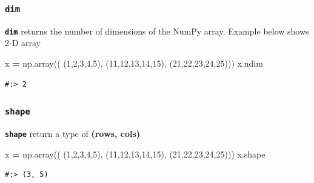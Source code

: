 \documentclass[
]{book}
\newenvironment{Shaded}{\begin{snugshade}}{\end{snugshade}}
\newcommand{\DecValTok}[1]{\textcolor[rgb]{0.06,0.06,0.06}{#1}}
\newcommand{\NormalTok}[1]{#1}
\newcommand{\OperatorTok}[1]{\textcolor[rgb]{0.43,0.43,0.43}{\textbf{#1}}}
\begin{document}
\hypertarget{dim}{%
\subsubsection{\texorpdfstring{\texttt{dim}}{dim}}\label{dim}}

\textbf{\texttt{dim}} returns the number of dimensions of the NumPy array. Example below shows 2-D array

\begin{Shaded}
\begin{Highlighting}[]
\NormalTok{x }\OperatorTok{=}\NormalTok{ np.array(( (}\DecValTok{1}\NormalTok{,}\DecValTok{2}\NormalTok{,}\DecValTok{3}\NormalTok{,}\DecValTok{4}\NormalTok{,}\DecValTok{5}\NormalTok{), }
\NormalTok{      (}\DecValTok{11}\NormalTok{,}\DecValTok{12}\NormalTok{,}\DecValTok{13}\NormalTok{,}\DecValTok{14}\NormalTok{,}\DecValTok{15}\NormalTok{),}
\NormalTok{      (}\DecValTok{21}\NormalTok{,}\DecValTok{22}\NormalTok{,}\DecValTok{23}\NormalTok{,}\DecValTok{24}\NormalTok{,}\DecValTok{25}\NormalTok{)))}
\NormalTok{x.ndim  }
\end{Highlighting}
\end{Shaded}

\begin{verbatim}
#:> 2
\end{verbatim}

\hypertarget{shape}{%
\subsubsection{\texorpdfstring{\texttt{shape}}{shape}}\label{shape}}

\textbf{\texttt{shape}} return a type of \textbf{(rows, cols)}

\begin{Shaded}
\begin{Highlighting}[]
\NormalTok{x }\OperatorTok{=}\NormalTok{ np.array(( (}\DecValTok{1}\NormalTok{,}\DecValTok{2}\NormalTok{,}\DecValTok{3}\NormalTok{,}\DecValTok{4}\NormalTok{,}\DecValTok{5}\NormalTok{), }
\NormalTok{      (}\DecValTok{11}\NormalTok{,}\DecValTok{12}\NormalTok{,}\DecValTok{13}\NormalTok{,}\DecValTok{14}\NormalTok{,}\DecValTok{15}\NormalTok{),}
\NormalTok{      (}\DecValTok{21}\NormalTok{,}\DecValTok{22}\NormalTok{,}\DecValTok{23}\NormalTok{,}\DecValTok{24}\NormalTok{,}\DecValTok{25}\NormalTok{)))}
\NormalTok{x.shape  }
\end{Highlighting}
\end{Shaded}

\begin{verbatim}
#:> (3, 5)
\end{verbatim}
\end{document}
